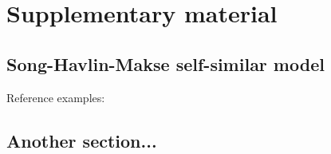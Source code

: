 \chapter{Supplementary material}


\section{Song-Havlin-Makse self-similar model}
 
Reference examples: 

\section{Another section...}



\newpage